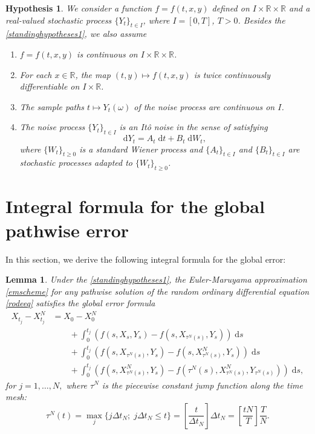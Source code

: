 \documentclass[reqno,12pt]{amsart}
\theoremstyle{plain}%
\newtheorem{lem}{Lemma}[section]
\newtheorem{stdhyp}{Hypothesis}[section]
\theoremstyle{definition}
\begin{document}
\begin{stdhyp}
    \label{standinghypotheses2}
    We consider a function $f=f(t, x, y)$ defined on $I\times \mathbb{R}\times\mathbb{R}$ and a real-valued stochastic process $\{Y_t\}_{t\in I}$, where $I=[0, T]$, $T > 0$. Besides the \cref{standinghypotheses1}, we also assume
    \begin{enumerate}
        \item $f = f(t, x, y)$ is continuous on $I\times \mathbb{R}\times \mathbb{R}$.
        \item For each $x\in \mathbb{R}$, the map $(t, y) \mapsto f(t, x, y)$ is twice continuously differentiable on $I\times \mathbb{R}$.
        \item The sample paths $t\mapsto Y_t(\omega)$ of the noise process are continuous on $I$.
        \item The noise process $\{Y_t\}_{t\in I}$ is an It\^o noise in the sense of satisfying
        \begin{equation}
            \mathrm{d}Y_t = A_t\;\mathrm{d}t + B_t\;\mathrm{d}W_t,
        \end{equation}
        where $\{W_t\}_{t\geq 0}$ is a standard Wiener process and $\{A_t\}_{t\in I}$ and $\{B_t\}_{t\in I}$ are stochastic processes adapted to $\{W_t\}_{t\geq 0}$.
    \end{enumerate}
\end{stdhyp}

\section{Integral formula for the global pathwise error}

In this section, we derive the following integral formula for the global error:
\begin{lem}
    Under the \cref{standinghypotheses1}, the Euler-Maruyama approximation \eqref{emscheme} for any pathwise solution of the random ordinary differential equation \eqref{rodeeq} satisfies the global error formula
    \begin{equation}
        \label{globalerrorintegralformula}
        \begin{aligned}
            X_{t_j} - X_{t_j}^N & = X_0 - X_0^N \\
            & \qquad + \int_0^{t_j} \left( f(s, X_s, Y_s) - f(s, X_{\tau^N(s)}, Y_s) \right)\;\mathrm{d}s  \\ 
            & \qquad + \int_{0}^{t_j} \left( f(s, X_{\tau^N(s)}, Y_s) - f(s, X_{\tau^N(s)}^N, Y_s) \right)\;\mathrm{d}s \\
            & \qquad + \int_0^{t_j} \left( f(s, X_{\tau^N(s)}^N, Y_s) - f(\tau^N(s), X_{\tau^N(s)}^N, Y_{\tau^N(s)}) \right)\;\mathrm{d}s,
        \end{aligned}
    \end{equation}
    for $j = 1, \ldots, N,$ where $\tau^N$ is the piecewise constant jump function along the time mesh:
    \begin{equation}
        \label{tauNt}
        \tau^N(t) = \max_j\{j\Delta t_N; \; j\Delta t_N \leq t\} = \left[\frac{t}{\Delta t_N}\right]\Delta t_N = \left[\frac{tN}{T}\right]\frac{T}{N}.
    \end{equation}
\end{lem}
\end{document}
